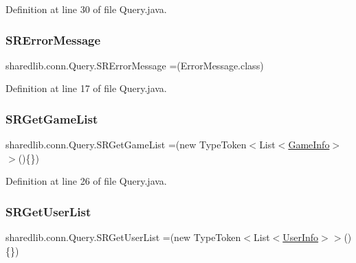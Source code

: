 Definition at line 30 of file Query.\+java.

\hypertarget{enumsharedlib_1_1conn_1_1_query_a8763182a3c749b5e6c26b02e375b53dc}{}\label{enumsharedlib_1_1conn_1_1_query_a8763182a3c749b5e6c26b02e375b53dc} 
\subsubsection{\texorpdfstring{S\+R\+Error\+Message}{SRErrorMessage}}
{\footnotesize\ttfamily sharedlib.\+conn.\+Query.\+S\+R\+Error\+Message =(Error\+Message.\+class)}



Definition at line 17 of file Query.\+java.

\hypertarget{enumsharedlib_1_1conn_1_1_query_a8f1920c9e5c361e835794de6995ad4cf}{}\label{enumsharedlib_1_1conn_1_1_query_a8f1920c9e5c361e835794de6995ad4cf} 
\subsubsection{\texorpdfstring{S\+R\+Get\+Game\+List}{SRGetGameList}}
{\footnotesize\ttfamily sharedlib.\+conn.\+Query.\+S\+R\+Get\+Game\+List =(new Type\+Token$<$List$<$\hyperlink{classsharedlib_1_1tuples_1_1_game_info}{Game\+Info}$>$$>$()\{\})}



Definition at line 26 of file Query.\+java.

\hypertarget{enumsharedlib_1_1conn_1_1_query_ab9bac40bb2fe89f9191824bbe1cb4436}{}\label{enumsharedlib_1_1conn_1_1_query_ab9bac40bb2fe89f9191824bbe1cb4436} 
\subsubsection{\texorpdfstring{S\+R\+Get\+User\+List}{SRGetUserList}}
{\footnotesize\ttfamily sharedlib.\+conn.\+Query.\+S\+R\+Get\+User\+List =(new Type\+Token$<$List$<$\hyperlink{classsharedlib_1_1tuples_1_1_user_info}{User\+Info}$>$$>$()\{\})}



